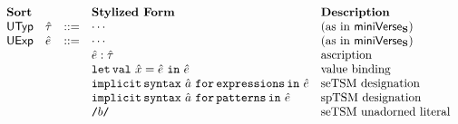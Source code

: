 \[\begin{array}{lllllll}
\textbf{Sort} & & 
& \textbf{Stylized Form} & \textbf{Description}\\
\mathsf{UTyp} & {\hat\tau} & ::= 
& \cdots & \text{(as in $\mathsf{miniVerse}_\textbf{S}$)}\\
\mathsf{UExp} & {\hat e} & ::= 
& \cdots & \text{(as in $\mathsf{miniVerse}_\textbf{S}$)}\\
&&
& {\hat e} : {\hat\tau} & \text{ascription}\\
&&
& \texttt{let\,val}~{\hat x}={\hat e}~\texttt{in}~{\hat e} & \text{value binding}\\
&&& \texttt{implicit\,syntax}~\hat{a}~\texttt{for\,expressions\,in}~{\hat e} & \text{seTSM designation}\\
&&& \texttt{implicit\,syntax}~\hat{a}~\texttt{for\,patterns\,in}~{\hat e} & \text{spTSM designation}\\
&&& {\texttt{/}b\texttt{/}} & \text{seTSM unadorned literal}\\

\end{array}\]
